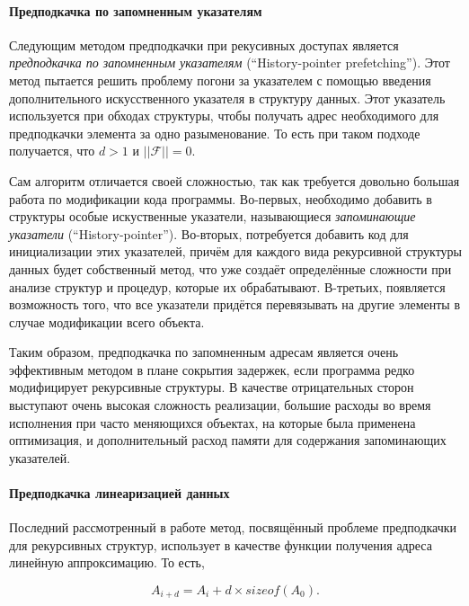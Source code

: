 \documentclass[12pt,a4paper,oneside]{article}
\begin{document}
\paragraph{Предподкачка по запомненным указателям}

Следующим методом предподкачки при рекусивных доступах является \emph{предподкачка по запомненным указателям} (``History-pointer prefetching''). Этот метод пытается решить проблему погони за указателем с помощью введения дополнительного искусственного указателя в структуру данных. Этот указатель используется при обходах структуры, чтобы получать адрес необходимого для предподкачки элемента за одно разыменование. То есть при таком подходе получается, что $d > 1$ и $||\mathcal{F}|| = 0$.

Сам алгоритм отличается своей сложностью, так как требуется довольно большая работа по модификации кода программы. Во-первых, необходимо добавить в структуры особые искуственные указатели, называющиеся \emph{запоминающие указатели} (``History-pointer''). Во-вторых, потребуется добавить код для инициализации этих указателей, причём для каждого вида рекурсивной структуры данных будет собственный метод, что уже создаёт определённые сложности при анализе структур и процедур, которые их обрабатывают. В-третьих, появляется возможность того, что все указатели придётся перевязывать на другие элементы в случае модификации всего объекта.

Таким образом, предподкачка по запомненным адресам является очень эффективным методом в плане сокрытия задержек, если программа редко модифицирует рекурсивные структуры. В качестве отрицательных сторон выступают очень высокая сложность реализации, большие расходы во время исполнения при часто меняющихся объектах, на которые была применена оптимизация, и дополнительный расход памяти для содержания запоминающих указателей.

\paragraph{Предподкачка линеаризацией данных}

Последний рассмотренный в работе метод, посвящённый проблеме предподкачки для рекурсивных структур, использует в качестве функции получения адреса линейную аппроксимацию. То есть,

\begin{displaymath}
  A_{i+d} = A_i + d \times sizeof(A_0).
\end{displaymath}
\end{document}
